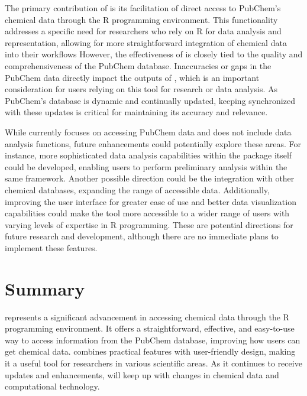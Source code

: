 The primary contribution of  is its facilitation of direct access to PubChem's chemical data through the R programming environment. This functionality addresses a specific need for researchers who rely on R for data analysis and representation, allowing for more straightforward integration of chemical data into their workflows However, the effectiveness of  is closely tied to the quality and comprehensiveness of the PubChem database. Inaccuracies or gaps in the PubChem data directly impact the outputs of , which is an important consideration for users relying on this tool for research or data analysis. As PubChem's database is dynamic and continually updated, keeping  synchronized with these updates is critical for maintaining its accuracy and relevance.

While  currently focuses on accessing PubChem data and does not include data analysis functions, future enhancements could potentially explore these areas. For instance, more sophisticated data analysis capabilities within the package itself could be developed, enabling users to perform preliminary analysis within the same framework. Another possible direction could be the integration with other chemical databases, expanding the range of accessible data. Additionally, improving the user interface for greater ease of use and better data visualization capabilities could make the tool more accessible to a wider range of users with varying levels of expertise in R programming. These are potential directions for future research and development, although there are no immediate plans to implement these features.

\hypertarget{summary}{%
\section{Summary}\label{summary}}

 represents a significant advancement in accessing chemical data through the R programming environment. It offers a straightforward, effective, and easy-to-use way to access information from the PubChem database, improving how users can get chemical data.  combines practical features with user-friendly design, making it a useful tool for researchers in various scientific areas. As it continues to receive updates and enhancements,  will keep up with changes in chemical data and computational technology.

